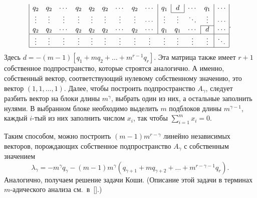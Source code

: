 \begin{equation}
\begin{array}{|cccccccccccccc|}
q_2 & q_2 & \cdots & q_2 & q_2 & q_2 & \cdots & q_2 & \cdots & \multicolumn{1}{|c|}{q_1} & \multicolumn{1}{c|}{d} & \cdots & \multicolumn{1}{c|}{q_1} & \cdots\\
\cline{11-11}
\vdots & \vdots & \vdots & \vdots & \vdots & \vdots & \vdots & \vdots & \cdots & \multicolumn{1}{|c}{\vdots} & \vdots & \ddots & \multicolumn{1}{c|}{\vdots} & \cdots\\
\cline{13-13}
q_2 & q_2 & \cdots & q_2 & q_2 & q_2 & \cdots & q_2 & \cdots & \multicolumn{1}{|c}{q_1} & q_1 & \cdots & \multicolumn{1}{|c|}{d} & \cdots\\
\hline
\vdots & \vdots & \vdots & \vdots & \vdots & \vdots & \vdots & \vdots & \vdots & \vdots & \vdots & \vdots & \multicolumn{1}{c|}{\vdots} & \ddots\\
\hline
\end{array}. \label{sizova:mult}
\end{equation}
Здесь $d = -(m - 1)\left[q_1 + m q_2 + \ldots + m^{r - 1}
q_r\right]$. Эта матрица также имеет ${r + 1}$ собственное
подпространство, которые строятся аналогично. А именно,
собственный вектор, соответствующий нулевому собственному
значению, это вектор $(1, 1, \ldots, 1)$. Далее, чтобы построить
подпространство $A_\gamma$, следует разбить вектор на блоки длины
$m^\gamma$, выбрать один из них, а остальные заполнить нулями. В
выбранном блоке необходимо выделить $m$ подблоков длины $m^{\gamma
- 1}$, каждый $i$-тый из них заполнить числом $x_i$, так чтобы
$\sum_{i = 1}^{m} x_i = 0$.

Таким способом, можно построить $(m - 1) m^{r - \gamma}$ линейно
независимых векторов, порождающих собственное подпространство
$A_\gamma$ с собственным значением
$$
\lambda_\gamma = -m^\gamma q_\gamma - (m - 1) m^\gamma (q_{\gamma
+ 1} + m q_{\gamma + 2} + \ldots + m^{r - \gamma - 1} q_r).
$$
Аналогично, получаем решение задачи Коши. (Описание этой задачи в
терминах $m$-адического анализа см.~в~[].)


